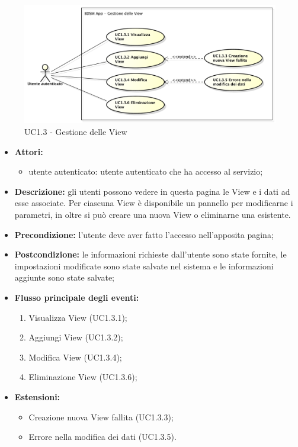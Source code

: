 \begin{figure}[!htbp]
	\centering
	\centerline{\includegraphics[scale=0.45]{./images/UC1_3.pdf}}
	\caption{UC1.3 - Gestione delle View}
\end{figure}

\begin{itemize}
	\item \textbf{Attori:}
	\begin{itemize}
		\item utente autenticato: utente autenticato che ha accesso al servizio;
	\end{itemize}
	\item \textbf{Descrizione:} gli utenti possono vedere in questa pagina le View e i dati ad esse associate. Per ciascuna View è disponibile un pannello per modificarne i parametri, in oltre si può creare una nuova View o eliminarne una esistente.
	\item \textbf{Precondizione:} l'utente deve aver fatto l'accesso nell'apposita pagina;
	\item \textbf{Postcondizione:} le informazioni richieste dall'utente sono state fornite, le impostazioni modificate sono state salvate nel sistema e le informazioni aggiunte sono state salvate;
	\item \textbf{Flusso principale degli eventi:}
	\begin{enumerate}
		\item Visualizza View (UC1.3.1);
		\item Aggiungi View (UC1.3.2);
		\item Modifica View (UC1.3.4);
		\item Eliminazione View (UC1.3.6);
	\end{enumerate}
	\item \textbf{Estensioni:}
	\begin{itemize}
		\item Creazione nuova View fallita (UC1.3.3);
		\item Errore nella modifica dei dati (UC1.3.5).
	\end{itemize}
\end{itemize}

